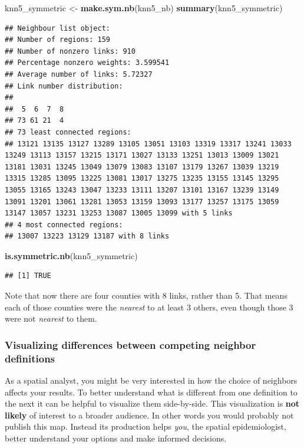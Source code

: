 \documentclass[
]{book}
\newenvironment{Shaded}{\begin{snugshade}}{\end{snugshade}}
\newcommand{\FunctionTok}[1]{\textcolor[rgb]{0.13,0.29,0.53}{\textbf{#1}}}
\newcommand{\NormalTok}[1]{#1}
\newcommand{\OtherTok}[1]{\textcolor[rgb]{0.56,0.35,0.01}{#1}}
\newenvironment{rmdtip}[1]
  {
  \begin{itemize}
  \renewcommand{\labelitemi}{
    \raisebox{-.7\height}[0pt][0pt]{
      {\setkeys{Gin}{width=3em,keepaspectratio}\texttt{[image: images/\#1]}}
    }
  }
  \setlength{\fboxsep}{1em}
  \begin{tip}
  \item
  }
  {
  \end{tip}
  \end{itemize}
  }
\begin{document}
\begin{Shaded}
\begin{Highlighting}[]
\NormalTok{knn5\_symmetric }\OtherTok{\textless{}{-}} \FunctionTok{make.sym.nb}\NormalTok{(knn5\_nb)}
\FunctionTok{summary}\NormalTok{(knn5\_symmetric)}
\end{Highlighting}
\end{Shaded}

\begin{verbatim}
## Neighbour list object:
## Number of regions: 159 
## Number of nonzero links: 910 
## Percentage nonzero weights: 3.599541 
## Average number of links: 5.72327 
## Link number distribution:
## 
##  5  6  7  8 
## 73 61 21  4 
## 73 least connected regions:
## 13121 13135 13127 13289 13105 13051 13103 13319 13317 13241 13033 13249 13113 13157 13215 13171 13027 13133 13251 13013 13009 13021 13181 13031 13245 13049 13079 13083 13107 13179 13267 13039 13219 13315 13285 13095 13225 13081 13017 13275 13235 13155 13145 13295 13055 13165 13243 13047 13233 13111 13207 13101 13167 13239 13149 13091 13201 13061 13281 13053 13159 13093 13177 13257 13175 13059 13147 13057 13231 13253 13087 13005 13099 with 5 links
## 4 most connected regions:
## 13007 13223 13129 13187 with 8 links
\end{verbatim}

\begin{Shaded}
\begin{Highlighting}[]
\FunctionTok{is.symmetric.nb}\NormalTok{(knn5\_symmetric)}
\end{Highlighting}
\end{Shaded}

\begin{verbatim}
## [1] TRUE
\end{verbatim}

Note that now there are four counties with 8 links, rather than 5. That means each of those counties were the \emph{nearest} to at least 3 others, even though those 3 were not \emph{nearest} to them.

\hypertarget{visualizing-differences-between-competing-neighbor-definitions}{%
\subsubsection{Visualizing differences between competing neighbor definitions}\label{visualizing-differences-between-competing-neighbor-definitions}}

\begin{rmdtip}{tip}
As a spatial analyst, you might be very interested in how the choice of neighbors affects your results. To better understand what is different from one definition to the next it can be helpful to visualize them side-by-side. This visualization is \textbf{not likely} of interest to a broader audience. In other words you would probably not publish this map. Instead its production helps \emph{you}, the spatial epidemiologist, better understand your options and make informed decisions.

\end{rmdtip}
\end{document}

